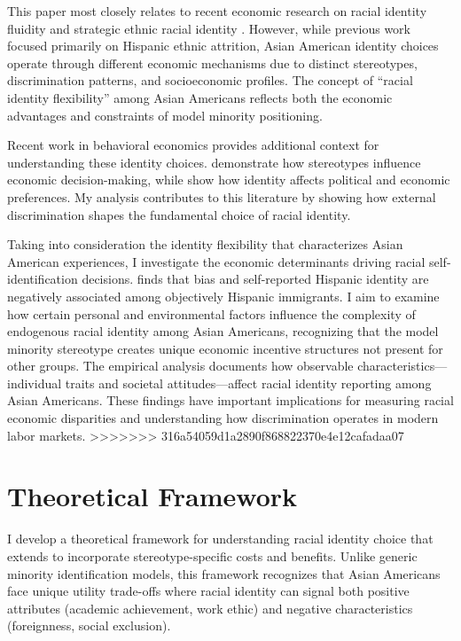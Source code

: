 This paper most closely relates to recent economic research on racial identity fluidity and strategic ethnic racial identity \autocite{hadah2024hispanicidentity, antmanEthnicAttritionObserved2016,antmanIncentivesIdentifyRacial2015,antmanAmericanIndianCasinos2021}. However, while previous work focused primarily on Hispanic ethnic attrition, Asian American identity choices operate through different economic mechanisms due to distinct stereotypes, discrimination patterns, and socioeconomic profiles. The concept of ``racial identity flexibility'' among Asian Americans reflects both the economic advantages and constraints of model minority positioning.

Recent work in behavioral economics provides additional context for understanding these identity choices. \textcite{bordaloStereotypes2016} demonstrate how stereotypes influence economic decision-making, while \textcite{bonomiIdentityBeliefsPolitical2021} show how identity affects political and economic preferences. My analysis contributes to this literature by showing how external discrimination shapes the fundamental choice of racial identity.

Taking into consideration the identity flexibility that characterizes Asian American experiences, I investigate the economic determinants driving racial self-identification decisions. \textcite{hadah2024hispanicidentity} finds that bias and self-reported Hispanic identity are negatively associated among objectively Hispanic immigrants. I aim to examine how certain personal and environmental factors influence the complexity of endogenous racial identity among Asian Americans, recognizing that the model minority stereotype creates unique economic incentive structures not present for other groups. The empirical analysis documents how observable characteristics—individual traits and societal attitudes—affect racial identity reporting among Asian Americans. These findings have important implications for measuring racial economic disparities and understanding how discrimination operates in modern labor markets.
>>>>>>> 316a54059d1a2890f868822370e4e12cafadaa07

\section{Theoretical Framework}\label{sec:model}

I develop a theoretical framework for understanding racial identity choice that extends \textcite{akerlofEconomicsIdentity2000} to incorporate stereotype-specific costs and benefits. Unlike generic minority identification models, this framework recognizes that Asian Americans face unique utility trade-offs where racial identity can signal both positive attributes (academic achievement, work ethic) and negative characteristics (foreignness, social exclusion).

